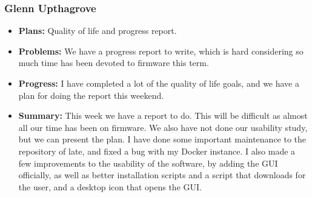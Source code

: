 \documentclass[onecolumn, draftclsnofoot,10pt, compsoc]{IEEEtran}
\begin{document}
\subsubsection{Glenn Upthagrove}
\begin {itemize}
 \item \textbf{Plans: }Quality of life and progress report. 
 \item \textbf{Problems: }We have a progress report to write, which is hard considering so much time has been devoted to firmware this term.    
 \item \textbf{Progress: }I have completed a lot of the quality of life goals, and we have a plan for doing the report this weekend. 
 \item \textbf{Summary: }This week we have a report to do. This will be difficult as almost all our time has been on firmware. We also have not done our usability study, but we can present the plan. I have done some important maintenance to the repository of late, and fixed a bug with my Docker instance. I also made a few improvements to the usability of the software, by adding the GUI officially, as well as better installation scripts and a script that downloads for the user, and a desktop icon that opens the GUI.     
\end {itemize}

%
%
\end{document}
